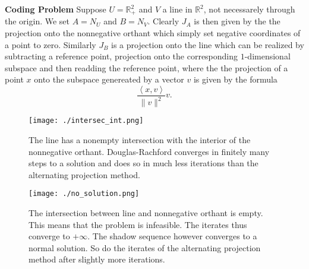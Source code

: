 \documentclass{scrartcl}
\newcommand{\R}{\mathbb{R}}
\theoremstyle{plain}
\theoremstyle{remark}
\begin{document}
\textbf{Coding Problem} Suppose $U = \R^2_+$ and $V$ a line in $\R^2$, not necessarely through the origin.
We set $A= N_U$ and $B=N_V$.
Clearly $J_A$ is then given by the the projection onto the nonnegative orthant which simply set negative coordinates of a point to zero.
Similarly $J_B$ is a projection onto the line which can be realized by subtracting a reference point, projection onto the corresponding $1$-dimensional subspace and then readding the reference point, where the the projection of a point $x$ onto the subspace genereated by a vector $v$ is given by the formula
\begin{equation}
  \frac{\left\langle x,v \right\rangle }{\lVert v \rVert^2} v.
\end{equation}

\begin{figure}%
  \texttt{[image: ./intersec\_int.png]}
  \centering
  \caption{The line has a nonempty intersection with the interior of the nonnegative orthant. Douglas-Rachford converges in finitely many steps to a solution and does so in much less iterations than the alternating projection method.}
\end{figure}

\begin{figure}%
  \texttt{[image: ./no\_solution.png]}
  \centering
  \caption{The intersection between line and nonnegative orthant is empty. This means that the problem is infeasible. The iterates thus converge to $+\infty$. The shadow sequence however converges to a normal solution. So do the iterates of the alternating projection method after slightly more iterations.} 
\end{figure}
\end{document}
